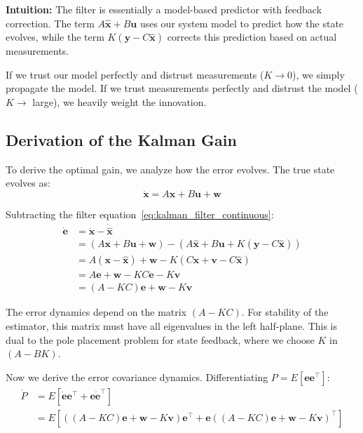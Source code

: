\textbf{Intuition:} The filter is essentially a model-based predictor with feedback correction. The term $A\hat{\mathbf{x}} + B\mathbf{u}$ uses our system model to predict how the state evolves, while the term $K(\mathbf{y} - C\hat{\mathbf{x}})$ corrects this prediction based on actual measurements.

If we trust our model perfectly and distrust measurements ($K \to 0$), we simply propagate the model. If we trust measurements perfectly and distrust the model ($K \to$ large), we heavily weight the innovation.

\subsection{Derivation of the Kalman Gain}

To derive the optimal gain, we analyze how the error evolves. The true state evolves as:
\begin{equation}
\dot{\mathbf{x}} = A\mathbf{x} + B\mathbf{u} + \mathbf{w}
\end{equation}

Subtracting the filter equation~\eqref{eq:kalman_filter_continuous}:
\begin{align}
\dot{\mathbf{e}} &= \dot{\mathbf{x}} - \dot{\hat{\mathbf{x}}} \\
&= (A\mathbf{x} + B\mathbf{u} + \mathbf{w}) - (A\hat{\mathbf{x}} + B\mathbf{u} + K(\mathbf{y} - C\hat{\mathbf{x}})) \\
&= A(\mathbf{x} - \hat{\mathbf{x}}) + \mathbf{w} - K(C\mathbf{x} + \mathbf{v} - C\hat{\mathbf{x}}) \\
&= A\mathbf{e} + \mathbf{w} - KC\mathbf{e} - K\mathbf{v} \\
&= (A - KC)\mathbf{e} + \mathbf{w} - K\mathbf{v}
\end{align}

The error dynamics depend on the matrix $(A - KC)$. For stability of the estimator, this matrix must have all eigenvalues in the left half-plane. This is dual to the pole placement problem for state feedback, where we choose $K$ in $(A - BK)$.

Now we derive the error covariance dynamics. Differentiating $P = E[\mathbf{e}\mathbf{e}^\top]$:
\begin{align}
\dot{P} &= E[\dot{\mathbf{e}}\mathbf{e}^\top + \mathbf{e}\dot{\mathbf{e}}^\top] \\
&= E[((A-KC)\mathbf{e} + \mathbf{w} - K\mathbf{v})\mathbf{e}^\top + \mathbf{e}((A-KC)\mathbf{e} + \mathbf{w} - K\mathbf{v})^\top]
\end{align}

